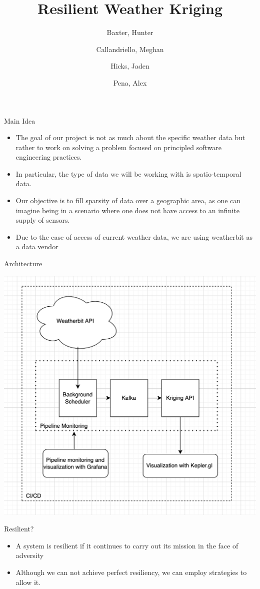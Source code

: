 \documentclass{beamer}
\title{Resilient Weather Kriging}
\author{
    Baxter, Hunter %
    \and
    Callandriello, Meghan
    \and
    Hicks, Jaden
    \and
    Pena, Alex
}
\begin{document}
\maketitle


\begin{frame}{Main Idea}
\begin{itemize}
    \item The goal of our project is not as much about the specific weather data
    but rather to work on solving a problem focused on principled software engineering practices. 
    \item In particular, the type of data we will be working with is spatio-temporal data.
    \item Our objective is to fill sparsity of data over a geographic area, as one can imagine being in a scenario where one does not have access to an infinite supply of sensors. 
    \item Due to the ease of access of current weather data, we are using weatherbit as a data vendor
\end{itemize}
\end{frame}

\begin{frame}{Architecture}
\begin{center}
    \includegraphics[width=.6\linewidth]{figures/architecture.png}
\end{center}
\end{frame}

\begin{frame}{Resilient?}
\begin{itemize}
    \item A system is resilient if it continues to carry out its mission in the face of adversity
    \item Although we can not achieve perfect resiliency, we can employ strategies to allow it. 
\end{itemize}    
\end{frame}
\end{document}
